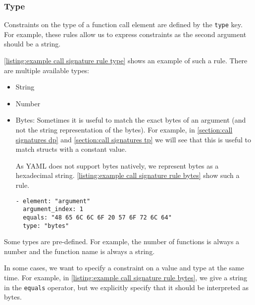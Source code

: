 \subsubsection{Type}
Constraints on the type of a function call element are defined by the \texttt{type} key. For example, these rules allow us to express constraints as the second argument should be a string.

\autoref{listing:example call signature rule type} shows an example of such a rule. There are multiple available types:
\begin{itemize}
  \item String

  \item Number

  \item Bytes: Sometimes it is useful to match the exact bytes of an argument (and not the string representation of the bytes). For example, in \autoref{section:call signatures dp} and \autoref{section:call signatures tp} we will see that this is useful to match structs with a constant value.

  As YAML does not support bytes natively, we represent bytes as a hexadecimal string. \autoref{listing:example call signature rule bytes} show such a rule.

\begin{lstlisting}[label={listing:example call signature rule bytes}, caption={An example rule specifying a bytes value.}, captionpos=b]
- element: "argument"
  argument_index: 1
  equals: "48 65 6C 6C 6F 20 57 6F 72 6C 64"
  type: "bytes"
\end{lstlisting}
\end{itemize}

Some types are pre-defined. For example, the number of functions is always a number and the function name is always a string.

In some cases, we want to specify a constraint on a value and type at the same time. For example, in \autoref{listing:example call signature rule bytes}, we give a string in the \texttt{equals} operator, but we explicitly specify that it should be interpreted as bytes.
